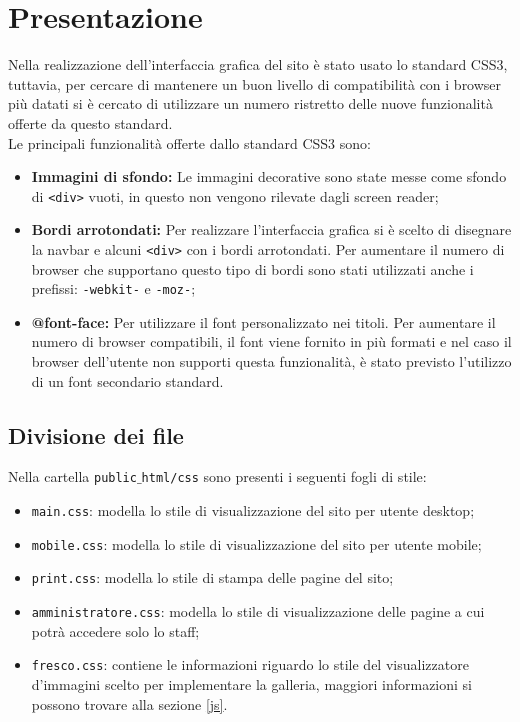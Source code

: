 \section{Presentazione} 

Nella realizzazione dell'interfaccia grafica del sito è stato usato lo standard CSS3, tuttavia, per cercare di mantenere un buon livello di compatibilità con i browser più datati si è cercato di utilizzare un numero ristretto delle nuove funzionalità offerte da questo standard.\\
Le principali funzionalità offerte dallo standard CSS3 sono:
\begin{itemize}
\item \textbf{Immagini di sfondo:} Le immagini decorative sono state messe come sfondo di \texttt{<div>} vuoti, in questo non vengono rilevate dagli screen reader;
\item \textbf{Bordi arrotondati:} Per realizzare l'interfaccia grafica si è scelto di disegnare la navbar e alcuni \texttt{<div>} con i bordi arrotondati. Per aumentare il numero di browser che supportano questo tipo di bordi sono stati utilizzati anche i prefissi: \texttt{-webkit-} e \texttt{-moz-};
\item \textbf{@font-face:} Per utilizzare il font personalizzato nei titoli. Per aumentare il numero di browser compatibili, il font viene fornito in più formati e nel caso il browser dell'utente non supporti questa funzionalità, è stato previsto l'utilizzo di un font secondario standard.
\end{itemize}



\subsection{Divisione dei file}

Nella cartella \texttt{public$\_$html/css} sono presenti i seguenti fogli di stile:
\begin{itemize}
\item \texttt{main.css}: modella lo stile di visualizzazione del sito per utente desktop;
\item \texttt{mobile.css}: modella lo stile di visualizzazione del sito per utente mobile;
\item \texttt{print.css}: modella lo stile di stampa delle pagine del sito;
\item \texttt{amministratore.css}: modella lo stile di visualizzazione delle pagine a cui potrà accedere solo lo staff;
\item \texttt{fresco.css}: contiene le informazioni riguardo lo stile del visualizzatore d'immagini scelto per implementare la galleria, maggiori informazioni si possono trovare alla sezione \ref{js}.
\end{itemize}
